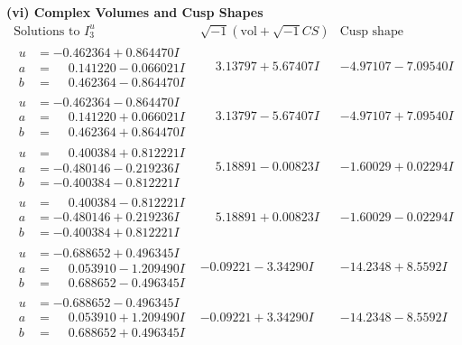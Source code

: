 \documentclass[1p]{elsarticle_modified}
\theoremstyle{definition}
\newcommand{\I}{\sqrt{-1}}
\begin{document}
\newpage\flushleft \textbf{(vi) Complex Volumes and Cusp Shapes}
$$\begin{array}{c|c|c}  
\text{Solutions to }I^u_{3}& \I (\text{vol} + \sqrt{-1}CS) & \text{Cusp shape}\\
 \hline 
\begin{aligned}
u &= -0.462364 + 0.864470 I \\
a &= \phantom{-}0.141220 - 0.066021 I \\
b &= \phantom{-}0.462364 - 0.864470 I\end{aligned}
 & \phantom{-}3.13797 + 5.67407 I & -4.97107 - 7.09540 I \\ \hline\begin{aligned}
u &= -0.462364 - 0.864470 I \\
a &= \phantom{-}0.141220 + 0.066021 I \\
b &= \phantom{-}0.462364 + 0.864470 I\end{aligned}
 & \phantom{-}3.13797 - 5.67407 I & -4.97107 + 7.09540 I \\ \hline\begin{aligned}
u &= \phantom{-}0.400384 + 0.812221 I \\
a &= -0.480146 - 0.219236 I \\
b &= -0.400384 - 0.812221 I\end{aligned}
 & \phantom{-}5.18891 - 0.00823 I & -1.60029 + 0.02294 I \\ \hline\begin{aligned}
u &= \phantom{-}0.400384 - 0.812221 I \\
a &= -0.480146 + 0.219236 I \\
b &= -0.400384 + 0.812221 I\end{aligned}
 & \phantom{-}5.18891 + 0.00823 I & -1.60029 - 0.02294 I \\ \hline\begin{aligned}
u &= -0.688652 + 0.496345 I \\
a &= \phantom{-}0.053910 - 1.209490 I \\
b &= \phantom{-}0.688652 - 0.496345 I\end{aligned}
 & -0.09221 - 3.34290 I & -14.2348 + 8.5592 I \\ \hline\begin{aligned}
u &= -0.688652 - 0.496345 I \\
a &= \phantom{-}0.053910 + 1.209490 I \\
b &= \phantom{-}0.688652 + 0.496345 I\end{aligned}
 & -0.09221 + 3.34290 I & -14.2348 - 8.5592 I \\ \hline\begin{aligned}

\end{aligned}
\end{array}$$
\end{document}
